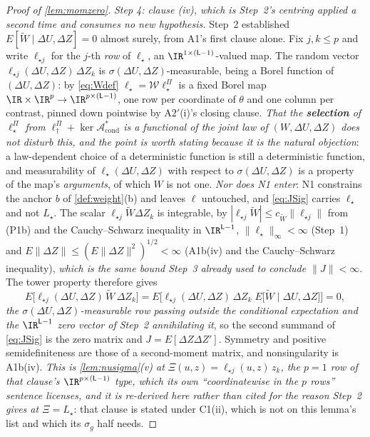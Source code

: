 \begin{proof}[Proof of \cref{lem:momzero}]
\emph{Step 4: clause \textup{(iv)}, which is Step~2's centring applied a second time and consumes no new
hypothesis.} Step~2 established $E[\widetilde W\mid\Delta U,\Delta Z]=0$ almost surely, from A1's first
clause alone. Fix $j,k\le p$ and write $\ell_{\star j}$ for the $j$-th \emph{row} of $\ell_\star$, an
$\IR^{1\times(\mathsf L-1)}$-valued map. The random vector $\ell_{\star j}(\Delta U,\Delta Z)\,\Delta Z_k$ is
$\sigma(\Delta U,\Delta Z)$-measurable, being a Borel function of $(\Delta U,\Delta Z)$: by \eqref{eq:Wdef}
$\ell_\star=\mathcal W\ell^\Pi_\star$ is a fixed Borel map $\IR\times\IR^{p}\to\IR^{p\times(\mathsf L-1)}$,
one row per coordinate of $\theta$ and one column per contrast, pinned down
pointwise by A$2'$(i)'s closing clause. \emph{That the \textbf{selection} of $\ell^\Pi_\star$ from
$\ell^\Pi_\dagger+\ker\mathcal A^\ast_{\mathrm{cond}}$ is a functional of the joint law of
$(W,\Delta U,\Delta Z)$ does not disturb this, and the point is worth stating because it is the natural
objection}: a law-dependent choice of a deterministic function is still a deterministic function, and
measurability of $\ell_\star(\Delta U,\Delta Z)$ with respect to $\sigma(\Delta U,\Delta Z)$ is a property
of the map's \emph{arguments}, of which $W$ is not one. \emph{Nor does N1 enter}: N1 constrains the anchor
$b$ of \cref{def:weight}(b) and leaves $\ell$ untouched, and \eqref{eq:JSig} carries $\ell_\star$ and not
$L_\star$. The scalar $\ell_{\star j}\widetilde W\Delta Z_k$ is integrable, by
$|\ell_{\star j}\widetilde W|\le c_{\widetilde W}\|\ell_{\star j}\|$ from \textup{(P1b)} and the
Cauchy--Schwarz inequality in $\IR^{\mathsf L-1}$, $\|\ell_\star\|_\infty<\infty$
(Step~1) and $E\|\Delta Z\|\le(E\|\Delta Z\|^{2})^{1/2}<\infty$ (A1b(iv) and the Cauchy--Schwarz
inequality), \emph{which is the same bound Step~3 already used to conclude $\|J\|<\infty$}. The tower
property therefore gives
\[
E\big[\ell_{\star j}(\Delta U,\Delta Z)\,\widetilde W\,\Delta Z_k\big]
=E\big[\ell_{\star j}(\Delta U,\Delta Z)\,\Delta Z_k\;E\big[\widetilde W\mid\Delta U,\Delta Z\big]\big]=0 ,
\]
\emph{the $\sigma(\Delta U,\Delta Z)$-measurable row passing outside the conditional expectation and the
$\IR^{\mathsf L-1}$ zero vector of Step~2 annihilating it},
so the second summand of \eqref{eq:JSig} is the zero matrix and $J=E[\Delta Z\Delta Z']$. Symmetry and
positive semidefiniteness are those of a second-moment matrix, and nonsingularity is A1b(iv).
\emph{This is \cref{lem:nusigma}\textup{(v)} at $\Xi(u,z)=\ell_{\star j}(u,z)\,z_k$, the $p=1$ row of
that clause's $\IR^{p\times(\mathsf L-1)}$ type, which its own ``coordinatewise in the $p$ rows'' sentence
licenses, and it is re-derived
here rather than cited for the reason Step~2 gives at $\Xi=L_\star$}: that clause is stated under C1(ii),
which is not on this lemma's list and which its $\sigma_g$ half needs.


\end{proof}
